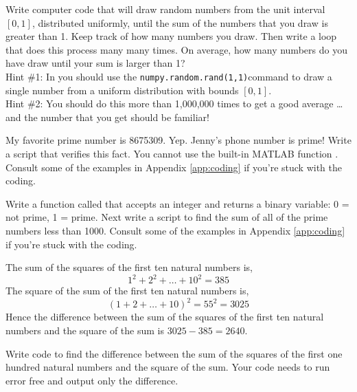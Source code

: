 \begin{problem}
    Write computer code that will draw random numbers from the unit interval $[0,1]$,
    distributed uniformly, until
    the sum of the numbers that you draw is greater than 1.  Keep track of how many
    numbers you draw.  Then write a loop that does this process many many times.  On
    average, how many numbers do you have draw until your sum is larger than 1? \\ 
    Hint
    \#1:
    In \ProgLang you should use the \ifnum{}  \else  \texttt{numpy.random.rand(1,1)}\fi command to draw a single
    number from a uniform distribution with bounds $[0,1]$. 
    \\ Hint \#2: You should do
    this more than 1,000,000 times to get a good average \ldots and the number that you
    get should be familiar!
\end{problem}



\begin{problem}
    My favorite prime number is 8675309.  Yep.  Jenny's phone number is prime!  Write a
    \ProgLang script that verifies this fact.  
    \ifnum{} You cannot use the built-in MATLAB function
    .\fi
    Consult some of the examples in Appendix \ref{app:coding} if you're stuck with
    the coding.
\end{problem}

\begin{problem}
    Write a function called  that accepts an integer and returns a
    binary variable: 0 = not prime, 1 = prime.
    Next write a \ProgLang script to find the sum of all of the prime numbers less than 1000.
    Consult some of the examples in Appendix \ref{app:coding} if you're stuck with
    the coding.
\end{problem}




\begin{problem}
    The sum of the squares of the first ten natural numbers is,
    \[ 1^2 + 2^2 + \dots + 10^2 = 385 \]
    The square of the sum of the first ten natural numbers is,
    \[ (1 + 2 + \dots + 10)^2 = 55^2 = 3025 \]
    Hence the difference between the sum of the squares of the first ten natural numbers
    and the square of the sum is $3025 - 385 = 2640$.

    Write code to find the difference between the sum of the squares of the first one
    hundred natural numbers and the square of the sum.  Your code needs to run error free
    and output only the difference.  
\end{problem}

